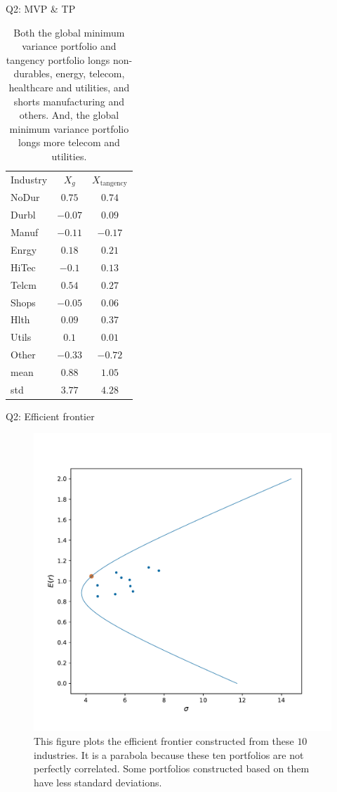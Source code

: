 \documentclass[10pt,t]{beamer}
\begin{document}
\begin{frame}{Q2: MVP \& TP}
\begin{table}
\begin{tabular}{lcc}
\toprule
Industry & $X_g$ & $X_{\text{tangency}}$ \\
\cmidrule{1-3}
NoDur & $0.75$ & $0.74$\\
Durbl & $-0.07$ & $0.09$\\
Manuf & $-0.11$ & $-0.17$\\
Enrgy & $0.18$ & $0.21$\\
HiTec & $-0.1$ & $0.13$\\
Telcm & $0.54$ & $0.27$\\
Shops & $-0.05$ & $0.06$\\
Hlth & $0.09$ & $0.37$\\
Utils & $0.1$ & $0.01$\\
Other & $-0.33$ & $-0.72$\\
\cmidrule{1-3}
mean & $0.88$ & $1.05$ \\
std & $3.77 $& $4.28$ \\
\bottomrule
\end{tabular}
\caption{Both the global minimum variance portfolio and tangency portfolio longs non-durables, energy, telecom, healthcare and utilities, and shorts manufacturing and others. And, the global minimum variance portfolio longs more telecom and utilities.}
\end{table}
\end{frame}


\begin{frame}{Q2: Efficient frontier}
\begin{figure}[h!]
\centering
\includegraphics[width=0.5\linewidth]{q2fig1.pdf}
\caption{This figure plots the efficient frontier constructed from these $10$ industries. It is a parabola because these ten portfolios are not perfectly correlated. Some portfolios constructed based on them have less standard deviations.}
\end{figure}
\end{frame}
\end{document}

